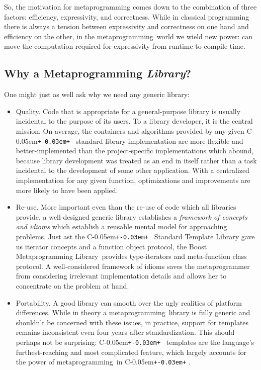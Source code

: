 \documentclass{netobjectdays}
\newcommand{\Cpp}{C\kern-0.05em\texttt{+\kern-0.03em+}%
}
\newcommand{\Mpl}{Boost Meta\-program\-ming Library}
\newcommand{\mping}{meta\-program\-ming}
\newcommand{\mpgmer}{meta\-program\-mer}
\begin{document}
So, the motivation for \mping{} comes down to the combination of three
factors: efficiency, expressivity, and correctness. While in classical
programming there is always a tension between expressivity and
correctness on one hand and efficiency on the other, in the \mping\
world we wield new power: can move the computation required for
expressivity from runtime to compile-time.

\subsection{Why a Metaprogramming \emph{Library}?}

One might just as well ask why we need any generic library: 
 
\begin{itemize}

\item Quality. Code that is appropriate for a general-purpose library
  is usually incidental to the purpose of its users. To a library
  developer, it is the central mission. On average, the containers and
  algorithms provided by any given \Cpp\ standard library
  implementation are more-flexible and better-implemented than the
  project-specific implementations which abound, because library
  development was treated as an end in itself rather than a task
  incidental to the development of some other application. With a
  centralized implementation for any given function, optimizations and
  improvements are more likely to have been applied.

\item Re-use. More important even than the re-use of code which all
  libraries provide, a well-designed generic library establishes a
  \emph{framework of concepts and idioms} which establish a reusable
  mental model for approaching problems. Just ast the \Cpp\ Standard
  Template Library gave us iterator concepts and a function object
  protocol, the \Mpl\ provides type-iterators and meta-function class
  protocol. A well-considered framework of idioms saves the \mpgmer{}
  from considering irrelevant implementation details and allows her to
  concentrate on the problem at hand.

\item Portability. A good library can smooth over the ugly realities
  of platform differences. While in theory a \mping\ library is fully
  generic and shouldn't be concerned with these issues, in practice,
  support for templates remains inconsistent even four years after
  standardization. This should perhaps not be surprising: \Cpp\
  templates are the language's furthest-reaching and most complicated
  feature, which largely accounts for the power of \mping\ in \Cpp.


\end{itemize}
\end{document}
